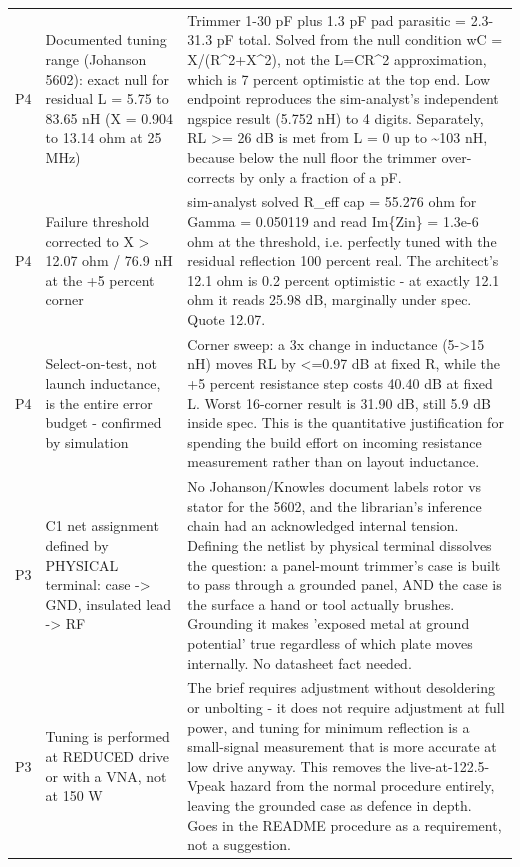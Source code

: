 \documentclass[11pt,a4paper]{article}
\begin{document}
{\begin{longtable}{lp{5.2cm}p{7.2cm}}
P4 & Documented tuning range (Johanson 5602): exact null for residual L = 5.75 to 83.65 nH (X = 0.904 to 13.14 ohm at 25 MHz) & Trimmer 1-30 pF plus 1.3 pF pad parasitic = 2.3-31.3 pF total. Solved from the null condition wC = X/(R\textasciicircum{}2+X\textasciicircum{}2), not the L=CR\textasciicircum{}2 approximation, which is 7 percent optimistic at the top end. Low endpoint reproduces the sim-analyst's independent ngspice result (5.752 nH) to 4 digits. Separately, RL \textgreater{}= 26 dB is met from L = 0 up to \textasciitilde{}103 nH, because below the null floor the trimmer over-corrects by only a fraction of a pF. \\
P4 & Failure threshold corrected to X \textgreater{} 12.07 ohm / 76.9 nH at the +5 percent corner & sim-analyst solved R\_eff cap = 55.276 ohm for \textbar{}Gamma\textbar{} = 0.050119 and read Im\{Zin\} = 1.3e-6 ohm at the threshold, i.e. perfectly tuned with the residual reflection 100 percent real. The architect's 12.1 ohm is 0.2 percent optimistic - at exactly 12.1 ohm it reads 25.98 dB, marginally under spec. Quote 12.07. \\
P4 & Select-on-test, not launch inductance, is the entire error budget - confirmed by simulation & Corner sweep: a 3x change in inductance (5-\textgreater{}15 nH) moves RL by \textless{}=0.97 dB at fixed R, while the +5 percent resistance step costs 40.40 dB at fixed L. Worst 16-corner result is 31.90 dB, still 5.9 dB inside spec. This is the quantitative justification for spending the build effort on incoming resistance measurement rather than on layout inductance. \\
P3 & C1 net assignment defined by PHYSICAL terminal: case -\textgreater{} GND, insulated lead -\textgreater{} RF & No Johanson/Knowles document labels rotor vs stator for the 5602, and the librarian's inference chain had an acknowledged internal tension. Defining the netlist by physical terminal dissolves the question: a panel-mount trimmer's case is built to pass through a grounded panel, AND the case is the surface a hand or tool actually brushes. Grounding it makes 'exposed metal at ground potential' true regardless of which plate moves internally. No datasheet fact needed. \\
P3 & Tuning is performed at REDUCED drive or with a VNA, not at 150 W & The brief requires adjustment without desoldering or unbolting - it does not require adjustment at full power, and tuning for minimum reflection is a small-signal measurement that is more accurate at low drive anyway. This removes the live-at-122.5-Vpeak hazard from the normal procedure entirely, leaving the grounded case as defence in depth. Goes in the README procedure as a requirement, not a suggestion. \\

\end{longtable}}
\end{document}
